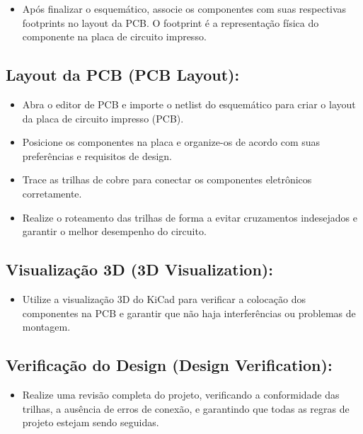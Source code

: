 \begin{itemize}
\tightlist
\item
  Após finalizar o esquemático, associe os componentes com suas respectivas footprints no layout da PCB. O footprint é a representação física do componente na placa de circuito impresso.
\end{itemize}

\hypertarget{layout-da-pcb-pcb-layout}{%
\subsection{Layout da PCB (PCB Layout):}\label{layout-da-pcb-pcb-layout}}

\begin{itemize}
\tightlist
\item
  Abra o editor de PCB e importe o netlist do esquemático para criar o layout da placa de circuito impresso (PCB).
\item
  Posicione os componentes na placa e organize-os de acordo com suas preferências e requisitos de design.
\item
  Trace as trilhas de cobre para conectar os componentes eletrônicos corretamente.
\item
  Realize o roteamento das trilhas de forma a evitar cruzamentos indesejados e garantir o melhor desempenho do circuito.
\end{itemize}

\hypertarget{visualizauxe7uxe3o-3d-3d-visualization}{%
\subsection{Visualização 3D (3D Visualization):}\label{visualizauxe7uxe3o-3d-3d-visualization}}

\begin{itemize}
\tightlist
\item
  Utilize a visualização 3D do KiCad para verificar a colocação dos componentes na PCB e garantir que não haja interferências ou problemas de montagem.
\end{itemize}

\hypertarget{verificauxe7uxe3o-do-design-design-verification}{%
\subsection{Verificação do Design (Design Verification):}\label{verificauxe7uxe3o-do-design-design-verification}}

\begin{itemize}
\tightlist
\item
  Realize uma revisão completa do projeto, verificando a conformidade das trilhas, a ausência de erros de conexão, e garantindo que todas as regras de projeto estejam sendo seguidas.
\end{itemize}

